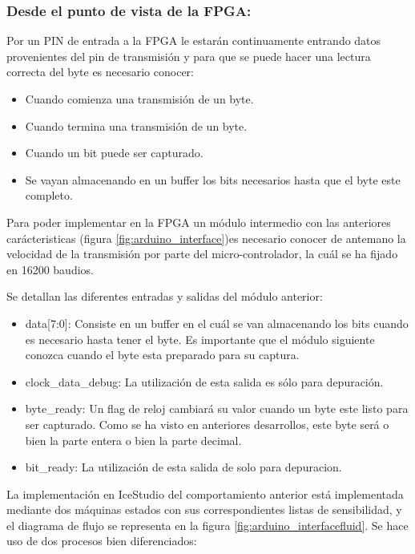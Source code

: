 \subsubsection{Desde el punto de vista de la FPGA:} \newline

Por un PIN de entrada a la FPGA le estarán continuamente entrando datos provenientes del pin de transmisión y para que se puede hacer una lectura correcta del byte es necesario conocer: 

\begin{itemize}
	\item Cuando comienza una transmisión de un byte.
	\item Cuando termina una transmisión de un byte.
	\item Cuando un bit puede ser capturado. 
	\item Se vayan almacenando en un buffer los bits necesarios hasta que el byte este completo.
\end{itemize}

Para poder implementar en la FPGA un módulo intermedio con las anteriores carácteristicas  (figura \ref{fig:arduino_interface})es necesario conocer de antemano la velocidad de la transmisión por parte del micro-controlador, la cuál se ha fijado en 16200 baudios. \newline

Se detallan las diferentes entradas y salidas del módulo anterior: 

\begin{itemize}
	\item data[7:0]: Consiste en un buffer en el cuál se van almacenando los bits cuando es necesario hasta tener el byte. Es importante que el módulo siguiente conozca cuando el byte esta preparado para su captura.
	\item clock\_data\_debug: La utilización de esta salida es sólo para depuración.
	\item byte\_ready: Un flag de reloj cambiará su valor cuando un byte este listo para ser capturado. Como se ha visto en anteriores desarrollos, este byte será o bien la parte entera o bien la parte decimal.
	\item bit\_ready: La utilización de esta salida de solo para depuracion.
\end{itemize} 

La implementación en IceStudio del comportamiento anterior está implementada mediante dos máquinas estados con sus correspondientes listas de sensibilidad, y el diagrama de flujo se representa en la figura \ref{fig:arduino_interfacefluid}. Se hace uso de dos procesos bien diferenciados:

